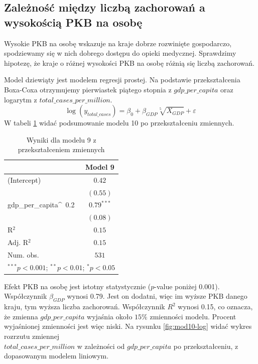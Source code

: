 \documentclass[12pt]{mwbk}
\theoremstyle{plain}
\theoremstyle{definition}
\theoremstyle{definition}
\begin{document}
\subsection{Zależność między liczbą zachorowań a wysokością PKB na osobę}

Wysokie PKB na osobę wskazuje na kraje dobrze rozwinięte gospodarczo, spodziewamy się w nich dobrego dostępu do opieki medycznej. Sprawdzimy hipotezę, że kraje o różnej wysokości PKB na osobę różnią się liczbą zachorowań.


Model dziewiąty jest modelem regresji prostej. Na podstawie przekształcenia Boxa-Coxa otrzymujemy pierwiastek piątego stopnia z $gdp\_per\_capita$ oraz logarytm z $total\_cases\_per\_million$.
$$\log(y_{total\_cases})=\beta_0+\beta_{GDP}\sqrt[5]{X_{GDP}}+\varepsilon$$
W tabeli \ref{table:mod10-log} widać podsumowanie modelu 10 po przekształceniu zmiennych.

\newpage

\begin{table}[!htbp]
	\begin{center}
		\begin{tabular}{l c}
			\hline
			& Model 9 \\
			\hline
			(Intercept)          & $0.42$       \\
			& $(0.55)$     \\
			gdp\_per\_capita\^~0.2 & $0.79^{***}$ \\
			& $(0.08)$     \\
			\hline
			R$^2$                & $0.15$       \\
			Adj. R$^2$           & $0.15$       \\
			Num. obs.            & $531$        \\
			\hline
			\multicolumn{2}{l}{\scriptsize{$^{***}p<0.001$; $^{**}p<0.01$; $^{*}p<0.05$}}
		\end{tabular}
		\caption{Wyniki dla modelu 9 z przekształceniem zmiennych}
		\label{table:mod10-log}
	\end{center}
\end{table}

Efekt PKB na osobę jest istotny statystycznie ($p$-value poniżej 0.001). Współczynnik $\beta_{GDP}$ wynosi 0.79. Jest on dodatni, więc im wyższe PKB danego kraju, tym wyższa liczba zachorowań. Współczynnik $R^2$ wynosi 0.15, co oznacza, że zmienna $gdp\_per\_capita$ wyjaśnia około $15\%$ zmienności modelu. Procent wyjaśnionej zmienności jest więc niski. Na rysunku \ref{fig:mod10-log} widać wykres rozrzutu zmiennej \\$total\_cases\_per\_million$ w zależności od $gdp\_per\_capita$ po przekształceniu, z dopasowanym modelem liniowym.
\end{document}
